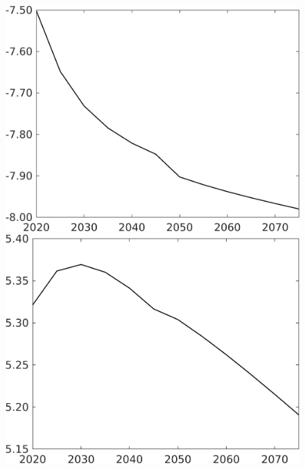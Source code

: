 \documentclass[12pt]{article}
\begin{document}
\begin{figure}[h!!]
	\begin{minipage}[]{0.32\textwidth}
		\includegraphics[width=1\textwidth]{../../codding_model/own_basedOnFried/optimalPol_010922_revision/figures/all_13Sept22/CompTaufPER_bytaul_Equlab_Reg0_C_spillover0_nsk0_xgr0_knspil0_sep1_LFlimit1_emsbase0_countec0_GovRev0_etaa0.79_lgd0.png}
	\end{minipage}		
	\begin{minipage}[]{0.32\textwidth}
		\includegraphics[width=1\textwidth]{../../codding_model/own_basedOnFried/optimalPol_010922_revision/figures/all_13Sept22/CompTaufPER_bytaul_Equlab_Reg0_sff_spillover0_nsk0_xgr0_knspil0_sep1_LFlimit1_emsbase0_countec0_GovRev0_etaa0.79_lgd0.png}

\end{minipage}
\end{figure}
\end{document}
